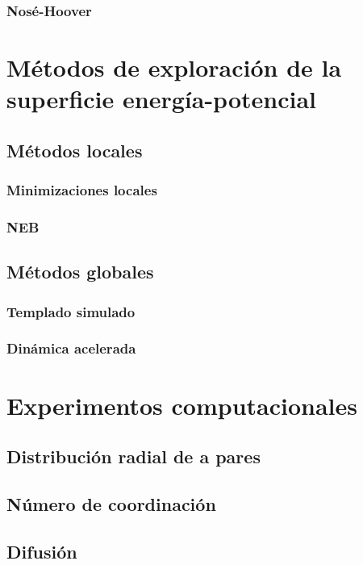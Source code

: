 \subsubsection{Nosé-Hoover}


\section{Métodos de exploración de la superficie energía-potencial}

\subsection{Métodos locales}

\subsubsection{Minimizaciones locales}
\subsubsection{NEB}

\subsection{Métodos globales}

\subsubsection{Templado simulado}
\subsubsection{Dinámica acelerada}


\section{Experimentos computacionales}

\subsection{Distribución radial de a pares}

\subsection{Número de coordinación}

\subsection{Difusión}
